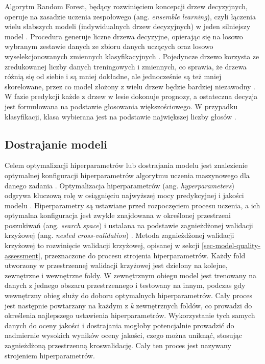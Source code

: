 \documentclass{amuthesis}
\begin{document}
Algorytm Random Forest, będący rozwinięciem koncepcji drzew decyzyjnych,
operuje na zasadzie uczenia zespołowego (ang. \emph{ensemble learning}),
czyli łączenia wielu słabszych modeli (indywidualnych drzew decyzyjnych)
w jeden silniejszy model
\autocite{aaron_2018_ml,sekulic_2020_rf_interpolation}. Procedura
generuje liczne drzewa decyzyjne, opierając się na losowo wybranym
zestawie danych ze zbioru danych uczących oraz losowo wyselekcjonowanych
zmiennych klasyfikacyjnych \autocite{breiman_2001_rf}. Pojedyncze drzewo
korzysta ze zredukowanej liczby danych treningowych i zmiennych, co
sprawia, że drzewa różnią się od siebie i są mniej dokładne, ale
jednocześnie są też mniej skorelowane, przez co model złożony z wielu
drzew będzie bardziej niezawodny
\autocite{sekulic_2020_rf_interpolation}. W fazie predykcji każde z
drzew w lesie dokonuje prognozy, a ostateczna decyzja jest formułowana
na podstawie głosowania większościowego. W przypadku klasyfikacji, klasa
wybierana jest na podstawie największej liczby głosów
\autocite{breiman_2001_rf}.

\hypertarget{dostrajanie-modeli}{%
\subsection{Dostrajanie modeli}\label{dostrajanie-modeli}}

Celem optymalizacji hiperparametrów lub dostrajania modelu jest
znalezienie optymalnej konfiguracji hiperparametrów algorytmu uczenia
maszynowego dla danego zadania \autocite{bischl_2024_mlr3}.
Optymalizacja hiperparametrów (ang. \emph{hyperparameters}) odgrywa
kluczową rolę w osiągnięciu najwyższej mocy predykcyjnej i jakości
modelu \autocite{schratz_2019_hyperparameters}. Hiperparametry są
ustawiane przed rozpoczęciem procesu uczenia, a ich optymalna
konfiguracja jest zwykle znajdowana w określonej przestrzeni poszukiwań
(ang. \emph{search space}) i ustalana na podstawie zagnieżdżonej
walidacji krzyżowej (ang. \emph{nested cross-validation})
\autocite{lovelace_2019_geocomputation}. Metoda zagnieżdżonej walidacji
krzyżowej to rozwinięcie walidacji krzyżowej, opisanej w sekcji
\ref{sec-model-quality-assessment}, przeznaczone do procesu strojenia
hiperparametrów. Każdy fold utworzony w przestrzennej walidacji
krzyżowej jest dzielony na kolejne, zewnętrzne i wewnętrzne foldy. W
zewnętrznym obiegu model jest trenowany na danych z jednego obszaru
przestrzennego i testowany na innym, podczas gdy wewnętrzny obieg służy
do doboru optymalnych hiperparametrów. Cały proces jest następnie
powtarzany na każdym z \emph{k} zewnętrznych foldów, co prowadzi do
określenia najlepszego ustawienia hiperparametrów. Wykorzystanie tych
samych danych do oceny jakości i dostrajania mogłoby potencjalnie
prowadzić do nadmiernie wysokich wyników oceny jakości, czego można
uniknąć, stosując zagnieżdżoną przestrzenną kroswalidację. Cały ten
proces jest nazywany strojeniem hiperparametrów.
\end{document}
